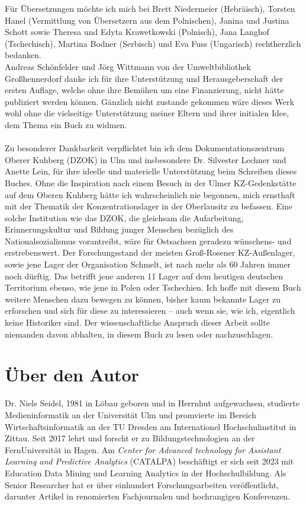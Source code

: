 \documentclass[a4paper,12pt,ngerman,
]{nisebook}
\begin{document}
Für Übersetzungen möchte ich mich bei Brett Niedermeier (Hebräisch), Torsten Hanel (Vermittlung von Übersetzern aus dem Polnischen), Janina und Justina Schott sowie Theresa und Edyta Krawetkowski (Polnisch), Jana Langhof (Tschechisch), Martina Bodner (Serbisch) und Eva Fuss (Ungarisch) rechtherzlich bedanken.
\\
Andreas Schönfelder und Jörg Wittmann von der Umweltbibliothek Großhennerdorf danke ich für ihre Unterstützung und Herausgeberschaft der ersten Auflage, welche ohne ihre Bemühen um eine Finanzierung, nicht hätte publiziert werden können. Gänzlich nicht zustande gekommen wäre dieses Werk wohl ohne die vielseitige Unterstützung meiner Eltern und ihrer initialen Idee, dem Thema ein Buch zu widmen.\\
\\
Zu besonderer Dankbarkeit verpflichtet bin ich dem Dokumentationszentrum Oberer Kuhberg (DZOK) in Ulm und insbesondere Dr. Silvester Lechner und Anette Lein, für ihre ideelle und materielle Unterstützung beim Schreiben dieses Buches. Ohne die Inspiration nach einem Besuch in der Ulmer KZ-Gedenkstätte auf dem Oberen Kuhberg hätte ich wahrscheinlich nie begonnen, mich ernsthaft mit der Thematik der Konzentrationslager in der Oberlausitz zu befassen. Eine solche Institution wie das DZOK, die gleichsam die Aufarbeitung, Erinnerungskultur und Bildung junger Menschen bezüglich des Nationalsozialismus vorantreibt, wäre für Ostsachsen geradezu wünschens- und erstrebenswert. Der Forschungsstand der meisten Groß-Rosener KZ-Außenlager, sowie jene Lager der Organisation Schmelt, ist nach mehr als 60 Jahren immer noch dürftig. Das betrifft jene anderen 11 Lager auf dem heutigen deutschen Territorium ebenso, wie jene in Polen oder Tschechien. Ich hoffe mit diesem Buch weitere Menschen dazu bewegen zu können, bisher kaum bekannte Lager zu erforschen und sich für diese zu interessieren -- auch wenn sie, wie ich, eigentlich keine Historiker sind. Der wissenschaftliche Anspruch dieser Arbeit sollte niemanden davon abhalten, in diesem Buch zu lesen oder nachzuschlagen.




\section*{Über den Autor}
Dr. Niels Seidel, 1981 in Löbau geboren und in Herrnhut aufgewachsen, studierte Medieninformatik an der Universität Ulm und promvierte im Bereich Wirtschaftsinformatik an der TU Dresden am Internationel Hochschulinstitut in Zittau. Seit 2017 lehrt und forscht er zu Bildungstechnologien an der FernUniversität in Hagen. Am \textit{Center for Advanced technology for Assistant Learning and Predictive Analytics} (CATALPA) beschäftigt er sich seit 2023 mit Education Data Mining und Learning Analytics in der Hochschulbildung. Als Senior Researcher hat er über einhundert Forschungsarbeiten veröffentlicht, darunter Artikel in renomierten Fachjournalen und hochrangigen Konferenzen.
\end{document}
